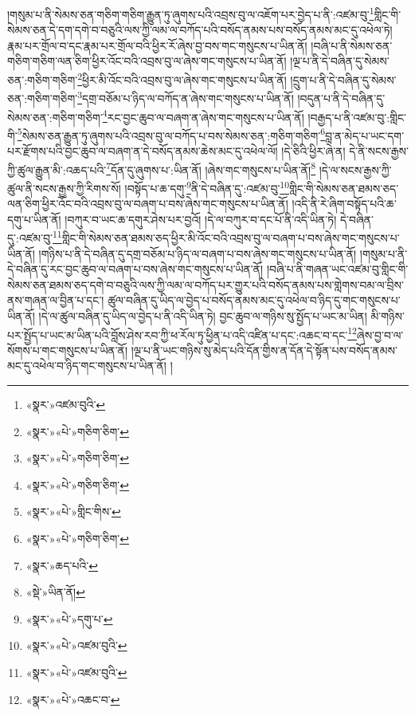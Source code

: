 །གསུམ་པ་ནི་སེམས་ཅན་གཅིག་གཅིག་རྒྱུན་ཏུ་ཞུགས་པའི་འབྲས་བུ་ལ་འཇོག་པར་བྱེད་པ་ནི་:འཛམ་བུ་\footnote{«སྣར་»འཛམ་བུའི་}གླིང་གི་སེམས་ཅན་དེ་དག་དགེ་བ་བཅུའི་ལས་ཀྱི་ལམ་ལ་བཀོད་པའི་བསོད་ནམས་པས་བསོད་ནམས་མང་དུ་འཕེལ་ཏེ། རྣམ་པར་གྲོལ་བ་དང་རྣམ་པར་གྲོལ་བའི་ཕྱིར་རོ་ཞེས་བྱ་བས་གང་གསུངས་པ་ཡིན་ནོ། །བཞི་པ་ནི་སེམས་ཅན་གཅིག་གཅིག་ལན་ཅིག་ཕྱིར་འོང་བའི་འབྲས་བུ་ལ་ཞེས་གང་གསུངས་པ་ཡིན་ནོ། །ལྔ་པ་ནི་དེ་བཞིན་དུ་སེམས་ཅན་:གཅིག་གཅིག་\footnote{«སྣར་»«པེ་»གཅིག་ཅིག་}ཕྱིར་མི་འོང་བའི་འབྲས་བུ་ལ་ཞེས་གང་གསུངས་པ་ཡིན་ནོ། །དྲུག་པ་ནི་དེ་བཞིན་དུ་སེམས་ཅན་:གཅིག་གཅིག་\footnote{«སྣར་»«པེ་»གཅིག་ཅིག་}དགྲ་བཅོམ་པ་ཉིད་ལ་བཀོད་ན་ཞེས་གང་གསུངས་པ་ཡིན་ནོ། །བདུན་པ་ནི་དེ་བཞིན་དུ་སེམས་ཅན་:གཅིག་གཅིག་\footnote{«སྣར་»«པེ་»གཅིག་ཅིག་}རང་བྱང་ཆུབ་ལ་བཞག་ན་ཞེས་གང་གསུངས་པ་ཡིན་ནོ། །བརྒྱད་པ་ནི་འཛམ་བུ་:གླིང་གི་\footnote{«སྣར་»«པེ་»གླིང་གིས་}སེམས་ཅན་རྒྱུན་ཏུ་ཞུགས་པའི་འབྲས་བུ་ལ་བཀོད་པ་བས་སེམས་ཅན་:གཅིག་གཅིག་\footnote{«སྣར་»«པེ་»གཅིག་ཅིག་}བླ་ན་མེད་པ་ཡང་དག་པར་རྫོགས་པའི་བྱང་ཆུབ་ལ་བཞག་ན་དེ་བསོད་ནམས་ཆེས་མང་དུ་འཕེལ་ལོ། །དེ་ཅིའི་ཕྱིར་ཞེ་ན། དེ་ནི་སངས་རྒྱས་ཀྱི་ཚུལ་རྒྱུན་མི་:འཆད་པའི་\footnote{«སྣར་»ཆད་པའི་}དོན་དུ་ཞུགས་པ་:ཡིན་ནོ། །ཞེས་གང་གསུངས་པ་ཡིན་ནོ།\footnote{«སྡེ་»ཡིན་ནོ།} །དེ་ལ་སངས་རྒྱས་ཀྱི་ཚུལ་ནི་སངས་རྒྱས་ཀྱི་རིགས་སོ། །བསྟོད་པ་ཆ་དགུ་\footnote{«སྣར་»«པེ་»དགུ་པ་}ནི་དེ་བཞིན་དུ་:འཛམ་བུ་\footnote{«སྣར་»«པེ་»འཛམ་བུའི་}གླིང་གི་སེམས་ཅན་ཐམས་ཅད་ལན་ཅིག་ཕྱིར་འོང་བའི་འབྲས་བུ་ལ་བཞག་པ་བས་ཞེས་གང་གསུངས་པ་ཡིན་ནོ། །འདི་ནི་རེ་ཞིག་བསྟོད་པའི་ཆ་དགུ་པ་ཡིན་ནོ། །བཀུར་བ་ཡང་ཆ་དགུར་ཤེས་པར་བྱའོ། །དེ་ལ་བཀུར་བ་དང་པོ་ནི་འདི་ཡིན་ཏེ། དེ་བཞིན་དུ་:འཛམ་བུ་\footnote{«སྣར་»«པེ་»འཛམ་བུའི་}གླིང་གི་སེམས་ཅན་ཐམས་ཅད་ཕྱིར་མི་འོང་བའི་འབྲས་བུ་ལ་བཞག་པ་བས་ཞེས་གང་གསུངས་པ་ཡིན་ནོ། །གཉིས་པ་ནི་དེ་བཞིན་དུ་དགྲ་བཅོམ་པ་ཉིད་ལ་བཞག་པ་བས་ཞེས་གང་གསུངས་པ་ཡིན་ནོ། །གསུམ་པ་ནི་དེ་བཞིན་དུ་རང་བྱང་ཆུབ་ལ་བཞག་པ་བས་ཞེས་གང་གསུངས་པ་ཡིན་ནོ། །བཞི་པ་ནི་གཞན་ཡང་འཛམ་བུ་གླིང་གི་སེམས་ཅན་ཐམས་ཅད་དགེ་བ་བཅུའི་ལས་ཀྱི་ལམ་ལ་བཀོད་པར་གྱུར་པའི་བསོད་ནམས་པས་གླེགས་བམ་ལ་བྲིས་ནས་གཞན་ལ་བྱིན་པ་དང་། ཚུལ་བཞིན་དུ་ཡིད་ལ་བྱེད་པ་བསོད་ནམས་མང་དུ་འཕེལ་བ་ཉིད་དུ་གང་གསུངས་པ་ཡིན་ནོ། །དེ་ལ་ཚུལ་བཞིན་དུ་ཡིད་ལ་བྱེད་པ་ནི་འདི་ཡིན་ཏེ། བྱང་ཆུབ་ལ་གཉིས་སུ་སྤྱོད་པ་ཡང་མ་ཡིན། མི་གཉིས་པར་སྤྱོད་པ་ཡང་མ་ཡིན་པའི་བློས་ཤེས་རབ་ཀྱི་ཕ་རོལ་ཏུ་ཕྱིན་པ་འདི་འཛིན་པ་དང་:འཆང་བ་དང་\footnote{«སྣར་»«པེ་»འཆང་བ་}ཞེས་བྱ་བ་ལ་སོགས་པ་གང་གསུངས་པ་ཡིན་ནོ། །ལྔ་པ་ནི་ཡང་གཉིས་སུ་མེད་པའི་དོན་གྱིས་ན་དོན་དེ་སྟོན་པས་བསོད་ནམས་མང་དུ་འཕེལ་བ་ཉིད་གང་གསུངས་པ་ཡིན་ནོ། །
